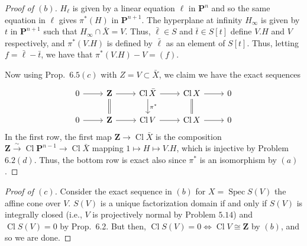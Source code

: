 \documentclass[12pt,letterpaper]{article}
\theoremstyle{definition}
\theoremstyle{remark}
\numberwithin{equation}{section}
\numberwithin{figure}{problem}
\DeclareMathOperator{\Spec}{Spec}
\DeclareMathOperator{\Cl}{Cl}
\newcommand{\isoto}{\overset{\sim}{\to}}
\begin{document}
\begin{proof}[Proof of $(b)$]
  $H_\ell$ is given by a linear equation $\ell$ in $\mathbf{P}^n$ and so the same equation in $\ell$ gives $\pi^*(H)$ in $\mathbf{P}^{n+1}$. The hyperplane at infinity $H_\infty$ is given by $t$ in $\mathbf{P}^{n+1}$ such that $H_\infty \cap \bar{X} = V$. Thus, $\bar{\ell} \in S$ and $\bar{t} \in S[t]$ define $V.H$ and $V$ respectively, and $\pi^*(V.H)$ is defined by $\bar{\ell}$ as an element of $S[t]$. Thus, letting $f = \bar{\ell} - \bar{t}$, we have that $\pi^*(V.H) - V = (f)$.
  \par Now using Prop.~$6.5(c)$ with $Z = V \subset \bar{X}$, we claim we have the exact sequences
  \begin{equation*}
    \begin{tikzcd}
      0 \rar & \mathbf{Z} \rar\dar[equal] & \Cl \bar{X} \rar\dar{\pi^*} & \Cl X \rar\dar[equal] & 0\\
      0 \rar & \mathbf{Z} \rar & \Cl V \rar & \Cl X \rar & 0
    \end{tikzcd}
  \end{equation*}
  In the first row, the first map $\mathbf{Z} \to \Cl \bar{X}$ is the composition $\mathbf{Z} \isoto \Cl \mathbf{P}^{n-1} \to \Cl \bar{X}$ mapping $1 \mapsto H \mapsto V.H$, which is injective by Problem $6.2(d)$. Thus, the bottom row is exact also since $\pi^*$ is an isomorphism by $(a)$.
\end{proof}
\begin{proof}[Proof of $(c)$]
  Consider the exact sequence in $(b)$ for $X = \Spec S(V)$ the affine cone over $V$. $S(V)$ is a unique factorization domain if and only if $S(V)$ is integrally closed (i.e., $V$ is projectively normal by Problem $5.14$) and $\Cl S(V) = 0$ by Prop.~6.2. But then, $\Cl S(V) = 0 \iff \Cl V \cong \mathbf{Z}$ by $(b)$, and so we are done.
\end{proof}
\end{document}
